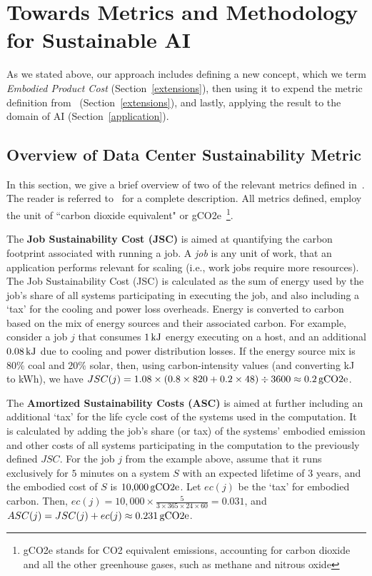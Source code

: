 \section{Towards Metrics and Methodology for Sustainable AI}
{
    \label{sec:metrics}

    As we stated above, our approach includes defining a new concept, which we term \textit{Embodied Product Cost} (Section~\ref{extensions}), then using it to expend the metric definition from~\cite{Gandhi2022} (Section~\ref{extensions}), and lastly, applying the result to the domain of AI (Section~\ref{application}).

    \subsection{Overview of Data Center Sustainability Metric}
    {
        \label{overview}

        In this section, we give a brief overview of two of the relevant metrics defined in~\cite{Gandhi2022}. The reader is referred to~\cite{Gandhi2022} for a complete description. All metrics defined, employ the unit of ``carbon dioxide equivalent" or gCO2e~\footnote{gCO2e stands for CO2 equivalent emissions, accounting for carbon dioxide and all the other greenhouse gases, such as methane and nitrous oxide}.

        The \textbf{Job Sustainability Cost (JSC)} is aimed at quantifying the carbon footprint associated with running a job. A \textit{job} is any unit of work, that an application performs relevant for scaling (i.e., work jobs require more resources). The Job Sustainability Cost (JSC) is calculated as the sum of energy used by the job's share of all systems participating in executing the job, and also including a `tax' for the cooling and power loss overheads. Energy is converted to carbon based on the mix of energy sources and their associated carbon. For example, consider a job $j$ that consumes $\unit[1]{kJ}$ energy executing on a host, and an additional $\unit[0.08]{kJ}$ due to cooling and power distribution losses. If the energy source mix is $80\%$ coal and $20\%$ solar, then, using carbon-intensity values (and converting kJ to kWh), we have $JSC \! \left ( j \right ) = 1.08 \times (0.8 \times 820 + 0.2 \times 48) \div 3600 \approx \unit[0.2]{gCO2e}$.  

        The \textbf{Amortized Sustainability Costs (ASC)} is aimed at further including an additional `tax' for the life cycle cost of the systems used in the computation. It is calculated by adding the job’s share (or tax) of the systems' embodied emission and other costs of all systems participating in the computation to the previously defined $JSC$. For the job $j$ from the example above, assume that it runs exclusively for $5$ minutes on a system $S$ with an expected lifetime of $3$ years, and the embodied cost of $S$  is $\unit[10,\!000]{gCO2e}$. Let $ec \! \left ( j \right )$ be the `tax' for embodied carbon. Then, $ec \! \left ( j \right ) = 10,\!000 \times \frac{5}{3\times 365 \times 24 \times 60} = 0.031$, and $ASC \! \left ( j \right ) = JSC \! \left ( j \right ) + ec \! \left ( j \right ) \approx \unit[0.231]{gCO2e}$. 

}}
